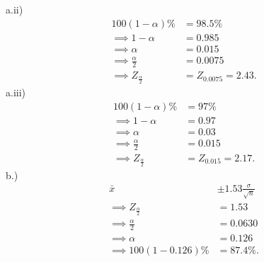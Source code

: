 \documentclass{report}
\begin{document}
\bigbreak \noindent 
a.ii)
\begin{align*}
    100(1-\alpha)\% &= 98.5\% \\
    \implies 1-\alpha &= 0.985 \\
    \implies \alpha &= 0.015 \\
    \implies \frac{\alpha}{2} &= 0.0075 \\
    \implies Z_{\frac{\alpha}{2}} &= Z_{0.0075} = 2.43
.\end{align*}
\bigbreak \noindent 
a.iii)
\begin{align*}
    100(1-\alpha)\% &= 97\% \\
    \implies 1-\alpha &= 0.97 \\
    \implies \alpha &= 0.03 \\
    \implies \frac{\alpha}{2} &= 0.015 \\
    \implies Z_{\frac{\alpha}{2}} &= Z_{0.015}  = 2.17
.\end{align*}
\bigbreak \noindent 
b.)
\begin{align*}
    \bar{x} &\pm 1.53 \frac{\sigma}{\sqrt{n}} \\ 
    \implies Z_{\frac{\alpha}{2}} &= 1.53  \\
    \implies \frac{\alpha}{2} &= 0.0630 \\
    \implies \alpha &= 0.126 \\
    \implies 100(1-0.126)\% &= 87.4\%
.\end{align*}
\end{document}
